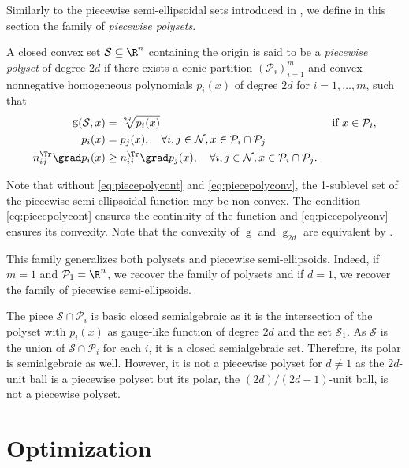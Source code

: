 \documentclass[11pt,twoside,a4paper,openright]{uclouvain-thesis}
\DeclareMathOperator{\gauge}{g}
\begin{document}
Similarly to the piecewise semi-ellipsoidal sets introduced in ,
we define in this section the family of \emph{piecewise polysets}.

\begin{mydef}
  \label{def:piecepoly}
  A closed convex set $\mathcal{S} \subseteq \R^n$ containing the origin is said to be a \emph{piecewise polyset} of degree $2d$ if there exists
  a conic partition $(\mathcal{P}_i)_{i=1}^m$
  and convex nonnegative homogeneous polynomials $p_i(x)$ of degree $2d$ for $i = 1, \ldots, m$,
  such that
  \begin{align}
    \notag
    \gauge(\mathcal{S}, x) & =
      \sqrt[2d]{p_i(x)} & \text{ if } x \in \mathcal{P}_i,
    \\
    \label{eq:piecepolycont}
    p_i(x) & = p_j(x), \quad \forall i, j \in \mathcal{N}, x \in \mathcal{P}_i \cap \mathcal{P}_j\\
    \label{eq:piecepolyconv}
    n_{ij}^\Tr \grad p_i(x) & \ge n_{ij}^\Tr \grad p_j(x), \quad \forall i, j \in \mathcal{N}, x \in \mathcal{P}_i \cap \mathcal{P}_j.
  \end{align}
\end{mydef}
Note that without \eqref{eq:piecepolycont} and \eqref{eq:piecepolyconv}, the 1-sublevel set of
the piecewise semi-ellipsoidal function may be non-convex.
The condition \eqref{eq:piecepolycont} ensures the continuity of the function
and \eqref{eq:piecepolyconv} ensures its convexity.
Note that the convexity of $\gauge$ and $\gauge_{2d}$ are equivalent by \cite[Corollary~15.3.1]{rockafellar2015convex}.

This family generalizes both polysets and piecewise semi-ellipsoids.
Indeed, if $m = 1$ and $\mathcal{P}_1 = \R^n$, we recover the family of polysets and
if $d = 1$, we recover the family of piecewise semi-ellipsoids.

The piece $\mathcal{S} \cap \mathcal{P}_i$ is basic closed semialgebraic as it is the intersection of the polyset with $p_i(x)$ as gauge-like function of degree $2d$ and the set $\mathcal{S}_1$.
As $\mathcal{S}$ is the union of $\mathcal{S} \cap \mathcal{P}_i$ for each $i$, it is a closed semialgebraic set.
Therefore, its polar is semialgebraic as well.
However, it is not a piecewise polyset for $d \neq 1$
as the $2d$-unit ball is a piecewise polyset but its polar,
the $(2d)/(2d-1)$-unit ball, is not a piecewise polyset.



\chapter{Optimization}
\label{chap:opti}
\end{document}
